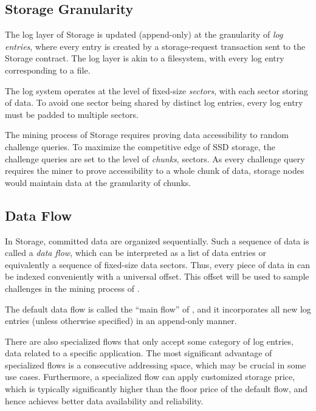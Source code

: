 \subsection{Storage Granularity}

The log layer of \projabbrev Storage is updated (append-only) at the granularity of \emph{log entries}, 
where every entry is created by a storage-request transaction sent to the \projabbrev Storage contract.
The log layer is akin to a filesystem, with every log entry corresponding to a file.

The log system operates at the level of fixed-size \emph{sectors}, with each sector storing \sectorsize of data. 
To avoid one sector being shared by distinct log entries,
every log entry must be padded to multiple sectors.

The mining process of \projabbrev Storage requires proving data accessibility to random challenge queries.
To maximize the competitive edge of SSD storage, the challenge queries are set to the level of \chunksize \emph{chunks},  sectors.
As every challenge query requires the miner to prove accessibility to a whole chunk of data, storage nodes would maintain data at the granularity of chunks. 

\subsection{Data Flow}
In \projabbrev Storage, committed data are organized sequentially.
Such a sequence of data is called a \emph{data flow}, which can be interpreted as a list of data entries or equivalently a sequence of fixed-size data sectors.
Thus, every piece of data in \project can be indexed conveniently with a universal offset.
This offset will be used to sample challenges in the mining process of \sproof.


The default data flow is called the ``main flow'' of \project, and it incorporates all new log entries (unless otherwise specified) in an append-only manner.

There are also specialized flows that only accept some category of log entries,
\eg data related to a specific application.
The most significant advantage of specialized flows is a consecutive addressing space, which may be crucial in some use cases. 
Furthermore, a specialized flow can apply customized storage price, which is typically significantly higher than the floor price of the default flow, and hence achieves better data availability and reliability.